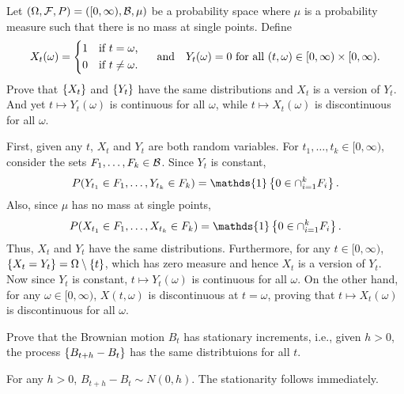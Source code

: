 \begin{exercise}{2.9}
    Let $(\Omega, \mathcal{F}, P) = ([0,\infty),\mathcal{B},\mu)$ be a probability space where 
    $\mu$ is a probability measure such that there is no mass at single points. 
    Define 
    \begin{equation*}
        X_t(\omega) = \begin{cases*}
            1 & if $t = \omega$, \\ 
            0 & if $t\neq \omega$.
        \end{cases*}\quad\text{and}\quad 
        Y_t(\omega) = 0\text{ for all } (t,\omega)\in[0,\infty)\times[0,\infty).
    \end{equation*} 
    Prove that $\left\{ {X_t} \right\}$ and $\left\{ {Y_t} \right\}$ have the same distributions and $X_t$ 
    is a version of $Y_t$. And yet $t\mapsto Y_t(\omega)$ is continuous for     all $\omega$, while $t\mapsto X_t(\omega)$ is discontinuous for all $\omega$. 
\end{exercise}
\begin{solution}
    First, given any $t$, $X_t$ and $Y_t$ are both random variables. For $t_1,\ldots,t_k\in[0,\infty)$, 
    consider the sets $F_1,\ldots,F_k\in\mathcal{B}$. Since $Y_t$ is constant, 
    \begin{equation*}
        P(Y_{t_1}\in F_1,\ldots,Y_{t_k}\in F_k) = \mathds{1}\set{0\in \cap_{i=1}^k F_i}.
    \end{equation*}
    Also, since $\mu$ has no mass at single points, 
    \begin{equation*}
        P(X_{t_1}\in F_1,\ldots,X_{t_k}\in F_k) = \mathds{1}\set{0\in \cap_{i=1}^k F_i}.
    \end{equation*}
    Thus, $X_t$ and $Y_t$ have the same distributions. Furthermore, for any 
    $t\in[0,\infty)$, $\left\{ {X_t = Y_t} \right\} = \Omega\setminus\left\{ {t} \right\}$, which has 
    zero measure and hence $X_t$ is a version of $Y_t$. Now since $Y_t$ is 
    constant, $t\mapsto Y_t(\omega)$ is continuous for all $\omega$. On the other 
    hand, for any $\omega\in[0,\infty)$, $X(t, \omega)$ is discontinuous at $t = \omega$, 
    proving that $t\mapsto X_t(\omega)$ is discontinuous for all $\omega$.
\end{solution}

\begin{exercise}{2.10}
    Prove that the Brownian motion $B_t$ has stationary increments, i.e., 
    given $h>0$, the process $\left\{ {B_{t+h}-B_t} \right\}$ has the same distribtuions 
    for all $t$. 
\end{exercise}
\begin{solution}
    For any $h>0$, $B_{t+h}-B_t\sim N(0, h)$. The stationarity follows immediately.
\end{solution}

